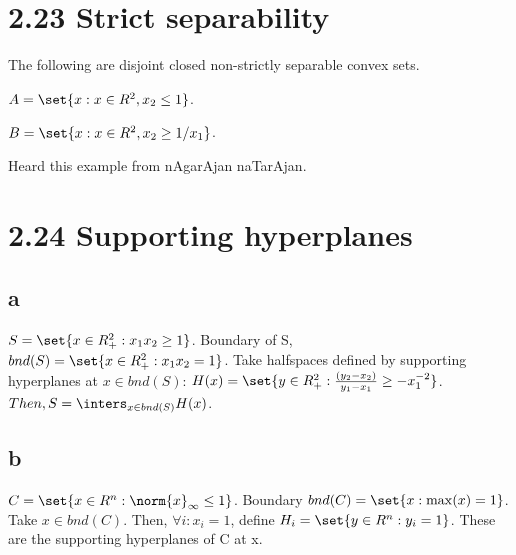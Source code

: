 \documentclass{article}
\begin{document}
\section{2.23 Strict separability}
The following are disjoint closed non-strictly separable convex sets.

$A = \set{x :x\in R^{2}, x_2 \leq 1}$.

$B = \set{x :x\in R^{2}, x_2 \geq 1/x_1}$.

\begin{ack}
Heard this example from nAgarAjan naTarAjan. 
\end{ack}

\section{2.24 Supporting hyperplanes}
\subsection{a}
$S = \set{x \in R_+^2: x_1 x_2 \geq 1}$. Boundary of S, $bnd(S) = \set{x \in R_+^2: x_1 x_2 = 1}$. Take halfspaces defined by supporting hyperplanes at $x \in bnd(S)$: $H(x) = \set{y \in R_+^2: \frac{(y_2 - x_2)}{y_1 - x_1} \geq -x_1^{-2}}$. $Then, S = \inters_{x \in bnd(S)} H(x)$.

\subsection{b}
$C = \set{x \in R^{n}: \norm{x}_\infty \leq 1}$. Boundary $bnd(C) = \set{x : \max(x) = 1}$. Take $x \in bnd(C)$. Then, $\forall i: x_i = 1$, define $H_i = \set{y \in R^{n}: y_i = 1}$. These are the supporting hyperplanes of C at x.

% 
% 
\end{document}

